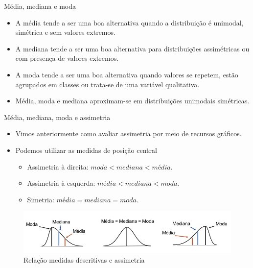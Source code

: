 \documentclass[
  ignorenonframetext,
  serif,
  professionalfont,
  usenames,
  dvipsnames,
  aspectratio = 169]{beamer}
\providecommand{\tightlist}{%
  \setlength{\itemsep}{0pt}\setlength{\parskip}{0pt}}
\renewcommand{\tightlist}{%
  \setlength{\itemsep}{0\baselineskip}
  \setlength{\parskip}{0.25\baselineskip}
}
\begin{document}
\begin{frame}{Média, mediana e moda}
\protect\hypertarget{muxe9dia-mediana-e-moda-1}{}
\begin{itemize}
\item
  A média tende a ser uma boa alternativa quando a distribuição é
  unimodal, simétrica e sem valores extremos.
\item
  A mediana tende a ser uma boa alternativa para distribuições
  assimétricas ou com presença de valores extremos.
\item
  A moda tende a ser uma boa alternativa quando valores se repetem,
  estão agrupados em classes ou trata-se de uma variável qualitativa.
\item
  Média, moda e mediana aproximam-se em distribuições unimodais
  simétricas.
\end{itemize}
\end{frame}

\begin{frame}{Média, mediana, moda e assimetria}
\protect\hypertarget{muxe9dia-mediana-moda-e-assimetria}{}
\begin{itemize}
\item
  Vimos anteriormente como avaliar assimetria por meio de recursos
  gráficos.
\item
  Podemos utilizar as medidas de posição central

  \begin{itemize}
  \tightlist
  \item
    Assimetria à direita: \(moda < mediana < média\).
  \item
    Assimetria à esquerda: \(média < mediana < moda\).
  \item
    Simetria: \(média = mediana = moda\).
  \end{itemize}
\end{itemize}

\begin{figure}

{\centering \includegraphics[width=0.9\linewidth]{./img/assimetria} 

}

\caption{Relação medidas descritivas e assimetria}\label{fig:unnamed-chunk-6}
\end{figure}
\end{frame}
\end{document}
